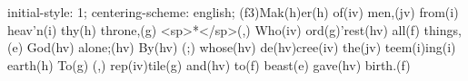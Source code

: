 initial-style: 1;
centering-scheme: english;
(f3)Mak(h)er(h) of(iv) men,(jv) from(i) heav'n(i) thy(h) throne,(g) <sp>*</sp>(,)
Who(iv) ord(g)'rest(hv) all(f) things,(e) God(hv) alone;(hv)
By(hv) (;) whose(hv) de(hv)cree(iv) the(jv) teem(i)ing(i) earth(h)
To(g) (,) rep(iv)tile(g) and(hv) to(f) beast(e) gave(hv) birth.(f)
